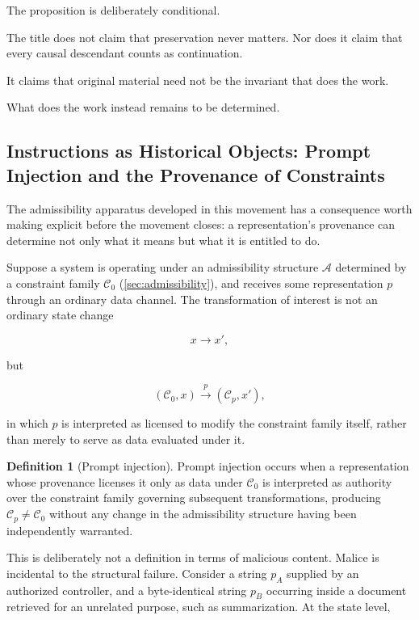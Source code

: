 \documentclass[
  11pt,
  a4paper,
  DIV=12,
  BCOR=0mm,
  parskip=half-
]{scrartcl}
\theoremstyle{definition}
\newtheorem{definition}{Definition}[section]
\theoremstyle{plain}
\theoremstyle{remark}
\begin{document}
The proposition is deliberately conditional.

The title does not claim that preservation never matters. Nor does it claim
that every causal descendant counts as continuation.

It claims that original material need not be the invariant that does the
work.

What does the work instead remains to be determined.


\subsection{Instructions as Historical Objects: Prompt Injection and the
Provenance of Constraints}
\label{sec:prompt-injection-authority}

The admissibility apparatus developed in this movement has a consequence
worth making explicit before the movement closes: a representation's
provenance can determine not only what it means but what it is entitled to
do.

Suppose a system is operating under an admissibility structure \(\mathcal A\)
determined by a constraint family \(\mathcal C_0\) (\cref{sec:admissibility}),
and receives some representation \(p\) through an ordinary data channel. The
transformation of interest is not an ordinary state change

\[
  x\longrightarrow x',
\]

but

\[
  (\mathcal C_0,x)
  \xrightarrow{\;p\;}
  (\mathcal C_p,x'),
\]

in which \(p\) is interpreted as licensed to modify the constraint family
itself, rather than merely to serve as data evaluated under it.

\begin{definition}[Prompt injection]
\label{def:prompt-injection}
Prompt injection occurs when a representation whose provenance licenses it
only as data under \(\mathcal C_0\) is interpreted as authority over the
constraint family governing subsequent transformations, producing
\(\mathcal C_p\neq\mathcal C_0\) without any change in the admissibility
structure having been independently warranted.
\end{definition}

This is deliberately not a definition in terms of malicious content. Malice
is incidental to the structural failure. Consider a string \(p_A\) supplied
by an authorized controller, and a byte-identical string \(p_B\) occurring
inside a document retrieved for an unrelated purpose, such as summarization.
At the state level,
\end{document}
